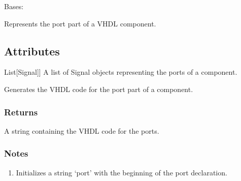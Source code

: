 \documentclass[letterpaper,10pt,english]{sphinxmanual}
\begin{document}
\begin{fulllineitems}
\label{\detokenize{port:port.Port}}
\pysigstartsignatures
{}
\pysigstopsignatures
\sphinxAtStartPar
Bases: 

\sphinxAtStartPar
Represents the port part of a VHDL component.


\subsection{Attributes}
\label{\detokenize{port:attributes}}\begin{description}
\sphinxlineitem{signals\_list}{[}List{[}Signal{]}{]}
\sphinxAtStartPar
A list of Signal objects representing the ports of a component.

\end{description}

\begin{fulllineitems}
\label{\detokenize{port:port.Port.port_to_vhdl}}
\pysigstartsignatures
{}
\pysigstopsignatures
\sphinxAtStartPar
Generates the VHDL code for the port part of a component.


\subsubsection{Returns}
\label{\detokenize{port:returns}}\begin{description}
\sphinxAtStartPar
A string containing the VHDL code for the ports.

\end{description}


\subsubsection{Notes}
\label{\detokenize{port:notes}}\begin{description}
\begin{enumerate}
%
\item {} 
\sphinxAtStartPar
Initializes a string ‘port’ with the beginning of the port declaration.


\end{enumerate}
\end{description}
\end{fulllineitems}
\end{fulllineitems}
\end{document}
